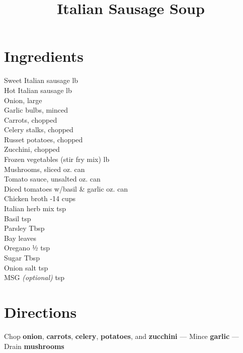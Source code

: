 \documentclass[11pt,letterpaper]{article}
\title{Italian Sausage Soup}
\author{}
\date{}
\begin{document}
\maketitle
\thispagestyle{empty}

\section*{Ingredients}
\setlength{\columnsep}{20pt}
\begin{multicols}{2}
\noindent
    Sweet Italian sausage  lb \\
    Hot Italian sausage  lb \\
    Onion, large  \\
    Garlic bulbs, minced  \\
    Carrots, chopped  \\
    Celery stalks, chopped  \\
    Russet potatoes, chopped  \\
    Zucchini, chopped  \\
    Frozen vegetables (stir fry mix)  lb \\
    \columnbreak
    Mushrooms, sliced  oz. can \\
    Tomato sauce, unsalted  oz. can \\
    Diced tomatoes w/basil \& garlic  oz. can \\
    Chicken broth -14 cups \\
    Italian herb mix  tsp \\
    Basil  tsp \\
    Parsley  Tbsp \\
    Bay leaves  \\
    Oregano \dotfill ½ tsp \\
    Sugar  Tbsp \\
    Onion salt  tsp \\
    MSG \textit{(optional)}  tsp
\end{multicols}

\section*{Directions}

\noindent
Chop \textbf{onion}, \textbf{carrots}, \textbf{celery}, \textbf{potatoes}, and \textbf{zucchini} ---
Mince \textbf{garlic} ---
Drain \textbf{mushrooms}
\end{document}
